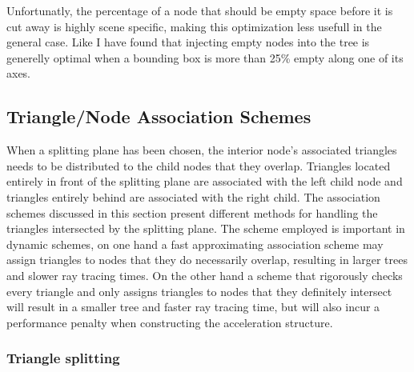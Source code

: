 Unfortunatly, the percentage of a node that should be empty space
before it is cut away is highly scene specific, making this
optimization less usefull in the general case. Like \zhou{} I have
found that injecting empty nodes into the tree is generelly optimal
when a bounding box is more than 25\% empty along one of its axes.





\subsection{Triangle/Node Association Schemes}\label{sec:splittingSchemes}

When a splitting plane has been chosen, the interior node's associated
triangles needs to be distributed to the child nodes that they
overlap. Triangles located entirely in front of the splitting plane
are associated with the left child node and triangles entirely behind
are associated with the right child. The association schemes discussed
in this section present different methods for handling the triangles
intersected by the splitting plane. The scheme employed is important
in dynamic schemes, on one hand a fast approximating association
scheme may assign triangles to nodes that they do necessarily overlap,
resulting in larger trees and slower ray tracing times. On the other
hand a scheme that rigorously checks every triangle and only assigns
triangles to nodes that they definitely intersect will result in a
smaller tree and faster ray tracing time, but will also incur a
performance penalty when constructing the acceleration structure.





\subsubsection{Triangle splitting}

